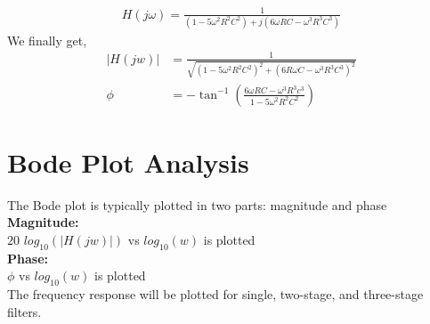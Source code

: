\documentclass[a4paper,12pt]{article}
\begin{document}
\begin{align*}
H(j\omega) = \frac{1}{(1-5\omega^2R^2C^2) + j(6\omega RC - \omega^3R^3C^3)}
\end{align*}
We finally get,
\begin{align*}
    |H(jw)| &= \frac{1}{\sqrt{(1 - 5\omega^2 R^2 C^2)^2 +(6R\omega C - \omega^3R^3C^3)^2}} \\
    \phi &= -\tan^{-1}\left( \frac{6\omega RC- \omega^3R^3c^3}{1-5\omega^2R^2C^2}\right)
\end{align*}
\section{Bode Plot Analysis}
The Bode plot is typically plotted in two parts: magnitude and phase\\

\textbf{Magnitude:}\\
$20$ $log_{10}(|H(jw)|)$ vs $log_{10}(w)$ is plotted\\

\textbf{Phase:}\\
$\phi$ vs $log_{10}(w)$ is plotted\\

The frequency response will be plotted for single, two-stage, and three-stage filters.
\end{document}
